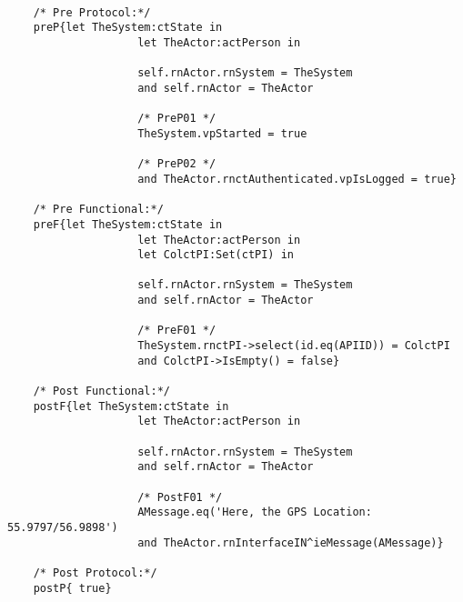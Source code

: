 	\scriptsize
	\vspace{0.5cm}
	\begin{lstlisting}[style=MessirStyle,firstnumber=auto,captionpos=b,caption={\msrmessir (MCL-oriented) specification of the operation \emph{oeGetGPSLocation}.},label=OM-actPerson-oeGetGPSLocation-MCL-LST]

	/* Pre Protocol:*/ 
	preP{let TheSystem:ctState in
					let TheActor:actPerson in
					
					self.rnActor.rnSystem = TheSystem
					and self.rnActor = TheActor
					
					/* PreP01 */
					TheSystem.vpStarted = true
					
					/* PreP02 */
					and TheActor.rnctAuthenticated.vpIsLogged = true}
	
	/* Pre Functional:*/
	preF{let TheSystem:ctState in
					let TheActor:actPerson in
					let ColctPI:Set(ctPI) in
					
					self.rnActor.rnSystem = TheSystem
					and self.rnActor = TheActor
					
					/* PreF01 */
					TheSystem.rnctPI->select(id.eq(APIID)) = ColctPI
					and ColctPI->IsEmpty() = false}
	
	/* Post Functional:*/ 
	postF{let TheSystem:ctState in
					let TheActor:actPerson in
					
					self.rnActor.rnSystem = TheSystem
					and self.rnActor = TheActor
					
					/* PostF01 */
					AMessage.eq('Here, the GPS Location: 55.9797/56.9898')
					and TheActor.rnInterfaceIN^ieMessage(AMessage)}
	
	/* Post Protocol:*/ 
	postP{ true}
	
	\end{lstlisting}
	\normalsize 
	
	
	
	





